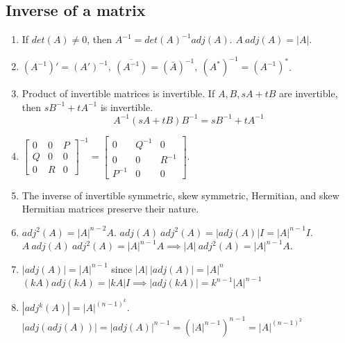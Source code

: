 \subsection{Inverse of a matrix}
\begin{enumerate}
	\item If $det(A) \ne 0$, then $A^{-1} = det(A)^{-1} adj(A)$.
		\subitem $A\ adj(A) = |A|$.
	\item $(A^{-1})' = (A')^{-1},\ \overline{(A^{-1})} = \left(\bar{A}\right)^{-1},\ (A^\ast)^{-1} = (A^{-1})^\ast$.
	\item Product of invertible matrices is invertible.
		\subitem If $A,B,sA+tB$ are invertible, then $sB^{-1}+tA^{-1}$ is invertible.
		$$ A^{-1}(sA+tB)B^{-1} = sB^{-1}+tA^{-1} $$
	\item $\begin{bmatrix} 0 & 0 & P \\ Q & 0 & 0 \\ 0 & R & 0 \end{bmatrix}^{-1} = \begin{bmatrix} 0 & Q^{-1} & 0 \\ 0 & 0 & R^{-1} \\ P^{-1} & 0 & 0 \end{bmatrix}$.
	\item The inverse of invertible symmetric, skew symmetric, Hermitian, and skew Hermitian matrices preserve their nature.
	\item $adj^2(A) = |A|^{n-2}A$.
		\subitem $adj(A)\ adj^2(A) = |adj(A)|I = |A|^{n-1}I$.
		\subitem $A\ adj(A)\ adj^2(A) = |A|^{n-1} A \implies |A|\ adj^2(A) = |A|^{n-1} A$.
	\item $|adj(A)| = |A|^{n-1}$ since $|A|\ |adj(A)| = |A|^n$
		\subitem $(kA) adj(kA) = |kA|I \implies |adj(kA)| = k^{n-1}|A|^{n-1}$
	\item $|adj^k(A)| = |A|^{(n-1)^k}$.
		\subitem $|adj(adj(A))| = |adj(A)|^{n-1} = (|A|^{n-1})^{n-1} = |A|^{(n-1)^2}$
\end{enumerate}


